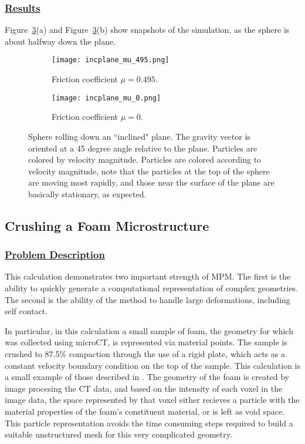 \subsubsection*{\underline{Results}}
Figure~\ref{figincplaneSphere}(a) and Figure~\ref{figincplaneSphere}(b)
show snapshots of the simulation, as
the sphere is about halfway down the plane.
\begin{figure}
  \centering
  \begin{subfigure}{0.4\textwidth}
    \texttt{[image: incplane\_mu\_495.png]}
    \caption{Friction coefficient $\mu = 0.495$.}
    \label{figincplaneSphere_bigmu}
  \end{subfigure}
  \begin{subfigure}{0.4\textwidth}
    \texttt{[image: incplane\_mu\_0.png]}
    \caption{Friction coefficient $\mu = 0$.}
    \label{figincplaneSphere_0mu}
  \end{subfigure}
  \caption{Sphere rolling down an ``inclined" plane.  The gravity vector
is oriented at a 45 degree angle relative to the plane.  Particles are colored
by velocity magnitude. 
Particles are colored according
to velocity magnitude, note that the particles at the top of the sphere
are moving most rapidly, and those near the surface of the plane are 
basically stationary, as expected.}
  \label{figincplaneSphere}
\end{figure}

\newpage
\subsection*{\center Crushing a Foam Microstructure}
\subsubsection*{\underline{Problem Description}}
This calculation demonstrates two important strength of MPM.  The first
is the ability to quickly generate a computational representation of
complex geometries.  The second is the ability of the method to handle
large deformations, including self contact.

In particular, in this calculation a small sample of foam, the geometry
for which was collected using microCT, is represented via material points.
The sample is crushed to 87.5\% compaction through the use of a rigid plate, which
acts as a constant velocity boundary condition on the top of the sample.  This
calculation is a small example of those described in \cite{brydonfoam}.  The
geometry of the foam is created by image procesing the CT data, and based
on the intensity of each voxel in the image data, the space represented
by that voxel either recieves a particle with the material properties of the
foam's constituent material, or is left as void space.  This particle
representation avoids the time consuming steps required to build a suitable
unstructured mesh for this very complicated geometry.
 
